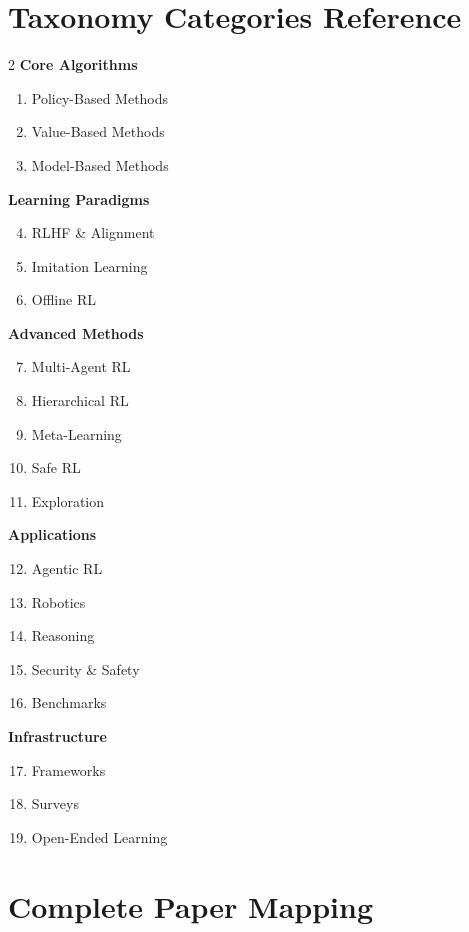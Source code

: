 \documentclass[12pt,a4paper]{report}
\theoremstyle{definition}
\begin{document}
\section*{Taxonomy Categories Reference}
\begin{multicols}{2}
\footnotesize
\noindent\textbf{Core Algorithms}
\begin{enumerate}
\item Policy-Based Methods
\item Value-Based Methods
\item Model-Based Methods
\end{enumerate}

\noindent\textbf{Learning Paradigms}
\begin{enumerate}
\setcounter{enumi}{3}
\item RLHF \& Alignment
\item Imitation Learning
\item Offline RL
\end{enumerate}

\noindent\textbf{Advanced Methods}
\begin{enumerate}
\setcounter{enumi}{6}
\item Multi-Agent RL
\item Hierarchical RL
\item Meta-Learning
\item Safe RL
\item Exploration
\end{enumerate}

\columnbreak
\noindent\textbf{Applications}
\begin{enumerate}
\setcounter{enumi}{11}
\item Agentic RL
\item Robotics
\item Reasoning
\item Security \& Safety
\item Benchmarks
\end{enumerate}

\noindent\textbf{Infrastructure}
\begin{enumerate}
\setcounter{enumi}{16}
\item Frameworks
\item Surveys
\item Open-Ended Learning
\end{enumerate}
\end{multicols}

\section*{Complete Paper Mapping}
\end{document}
